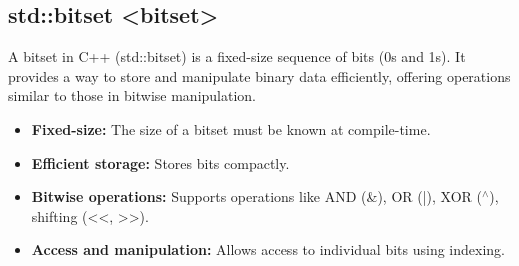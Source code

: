 \documentclass{report}
\begin{document}
     \subsection{std::bitset <bitset>}
     \bigbreak \noindent 
     A bitset in C++ (std::bitset) is a fixed-size sequence of bits (0s and 1s). It provides a way to store and manipulate binary data efficiently, offering operations similar to those in bitwise manipulation.
     \begin{itemize}
         \item \textbf{Fixed-size:} The size of a bitset must be known at compile-time.
         \item \textbf{Efficient storage:} Stores bits compactly.
         \item \textbf{Bitwise operations:} Supports operations like AND (\&), OR (|), XOR ($^{\land}$), shifting (<<, >>).
         \item \textbf{Access and manipulation:} Allows access to individual bits using indexing.
     \end{itemize}
     \bigbreak \noindent 
\end{document}
